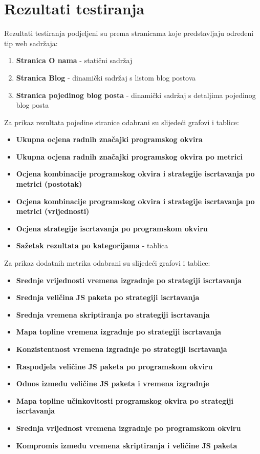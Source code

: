 \section{Rezultati testiranja}
Rezultati testiranja podjeljeni su prema stranicama koje predstavljaju određeni tip web sadržaja:

\begin{enumerate}
    \item \textbf{Stranica O nama} - statični sadržaj
    \item \textbf{Stranica Blog} - dinamički sadržaj s listom blog postova
    \item \textbf{Stranica pojedinog blog posta} - dinamički sadržaj s detaljima pojedinog blog posta
\end{enumerate}

\bigskip
\noindent
Za prikaz rezultata pojedine stranice odabrani su slijedeći grafovi i tablice:

\begin{itemize}
    \item \textbf{Ukupna ocjena radnih značajki programskog okvira}
    \item \textbf{Ukupna ocjena radnih značajki programskog okvira po metrici}
    \item \textbf{Ocjena kombinacije programskog okvira i strategije iscrtavanja po metrici (postotak)}
    \item \textbf{Ocjena kombinacije programskog okvira i strategije iscrtavanja po metrici (vrijednosti)}
    \item \textbf{Ocjena strategije iscrtavanja po programskom okviru}
    \item \textbf{Sažetak rezultata po kategorijama} - tablica
\end{itemize}

\bigskip
\noindent
Za prikaz dodatnih metrika odabrani su slijedeći grafovi i tablice:

\begin{itemize}
    \item \textbf{Srednje vrijednosti vremena izgradnje po strategiji iscrtavanja}
    \item \textbf{Srednja veličina JS paketa po strategiji iscrtavanja}
    \item \textbf{Srednja vremena skriptiranja po strategiji iscrtavanja}
    \item \textbf{Mapa topline vremena izgradnje po strategiji iscrtavanja}
    \item \textbf{Konzistentnost vremena izgradnje po strategiji iscrtavanja}
    \item \textbf{Raspodjela veličine JS paketa po programskom okviru}
    \item \textbf{Odnos između veličine JS paketa i vremena izgradnje}
    \item \textbf{Mapa topline učinkovitosti programskog okvira po strategiji iscrtavanja}
    \item \textbf{Srednja vrijednost vremena izgradnje po programskom okviru}
    \item \textbf{Kompromis između vremena skriptiranja i veličine JS paketa}
\end{itemize}

